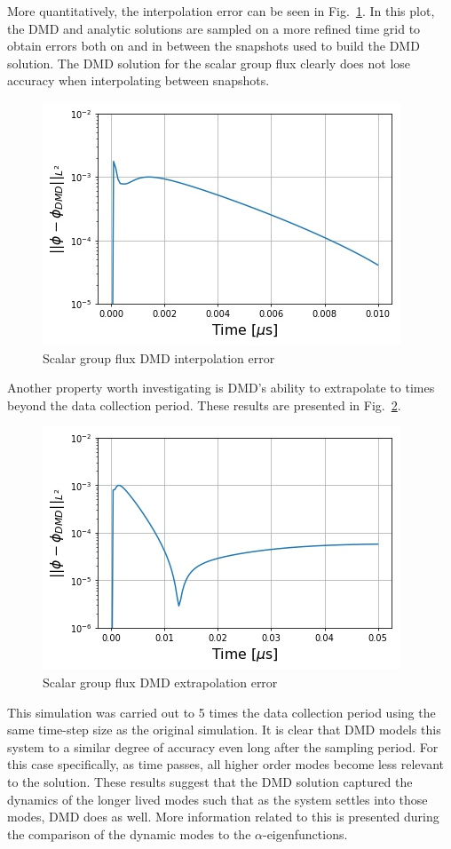 \documentclass{style/nseJournal}
\newcommand{\LFI}[1]{\label{fi:#1}}
\newcommand{\FI}[1]{Fig.~\ref{fi:#1}}
\newcommand{\bfg}{\begin{figure}}
\newcommand{\efg}{\end{figure}}
\begin{document}
More quantitatively, the interpolation error can be seen in \FI{interp-flux}.  
In this plot, the DMD and analytic solutions are sampled on a more refined time grid to obtain errors both on and in between the snapshots used to build the DMD solution.  
The DMD solution for the scalar group flux clearly does not lose accuracy when interpolating between snapshots.  
\bfg[!htb] \centering
	\includegraphics[scale=0.5]{figures/flux_interp_error.jpg}
	\caption{Scalar group flux DMD interpolation error}
	\LFI{interp-flux}
\efg
Another property worth investigating is DMD's ability to extrapolate to times beyond the data collection period.  
These results are presented in \FI{extrap-flux}.  
\bfg[!htb] \centering
	\includegraphics[scale=0.5]{figures/flux_extrap_error.jpg}
	\caption{Scalar group flux DMD extrapolation error}
	\LFI{extrap-flux}
\efg
This simulation was carried out to 5 times the data collection period using the same time-step size as the original simulation.  
It is clear that DMD models this system to a similar degree of accuracy even long after the sampling period.  
For this case specifically, as time passes, all higher order modes become less relevant to the solution.  
These results suggest that the DMD solution captured the dynamics of the longer lived modes such that as the system settles into those modes, DMD does as well.  
More information related to this is presented during the comparison of the dynamic modes to the $\alpha$-eigenfunctions.  
\end{document}
